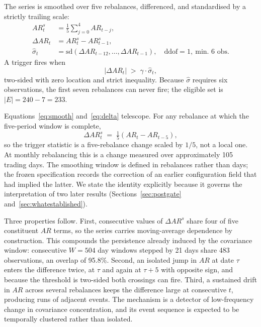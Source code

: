 \documentclass[12pt,letterpaper]{article}
\begin{document}
The series is smoothed over five rebalances, differenced, and standardised by a
strictly trailing scale:
\begin{align}
AR^{s}_t &= \tfrac{1}{5}\textstyle\sum_{j=0}^{4} AR_{t-j}, \label{eq:smooth}\\
\Delta AR_t &= AR^{s}_t - AR^{s}_{t-1}, \label{eq:delta}\\
\hat{\sigma}_t &= \mathrm{sd}\!\left(\Delta AR_{t-12},\dots,\Delta AR_{t-1}\right),
\quad \text{ddof} = 1,\ \text{min.\ 6 obs.} \label{eq:sigma}
\end{align}
A trigger fires when
\begin{equation}
\left| \Delta AR_t \right| \;>\; \gamma \cdot \hat{\sigma}_t,
\label{eq:trigger}
\end{equation}
two-sided with zero location and strict inequality. Because $\hat{\sigma}$ requires
six observations, the first seven rebalances can never fire; the eligible set is
$|E| = 240 - 7 = 233$.

Equations~\eqref{eq:smooth} and~\eqref{eq:delta} telescope. For any rebalance at
which the five-period window is complete,
\begin{equation}
\Delta AR^{s}_{t} \;=\; \tfrac{1}{5}\left(AR_{t} - AR_{t-5}\right),
\label{eq:fivelag}
\end{equation}
so the trigger statistic is a five-rebalance change scaled by $1/5$, not a local one.
At monthly rebalancing this is a change measured over approximately 105 trading days.
The smoothing window is defined in rebalances rather than days; the frozen
specification records the correction of an earlier configuration field that had
implied the latter. We state the identity explicitly because it governs the interpretation of two later results (Sections~\ref{sec:postgate} and~\ref{sec:whatestablished}).

Three properties follow. First, consecutive values of $\Delta AR^{s}$ share four of
five constituent $AR$ terms, so the series carries moving-average dependence by
construction. This compounds the persistence already induced by the covariance
window: consecutive $W = 504$ day windows stepped by 21 days share 483 observations,
an overlap of 95.8\%. Second, an isolated jump in $AR$ at date $\tau$ enters the
difference twice, at $\tau$ and again at $\tau + 5$ with opposite sign, and because
the threshold is two-sided both crossings can fire. Third, a sustained drift in $AR$
across several rebalances keeps the difference large at consecutive $t$, producing
runs of adjacent events. The mechanism is a detector of low-frequency change in
covariance concentration, and its event sequence is expected to be temporally
clustered rather than isolated.
\end{document}
